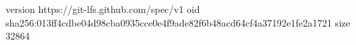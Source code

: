 version https://git-lfs.github.com/spec/v1
oid sha256:013ff4cdbe04d98cba0935cce0e4f9ade82f6b48acd64cf4a37192e1fe2a1721
size 32864

